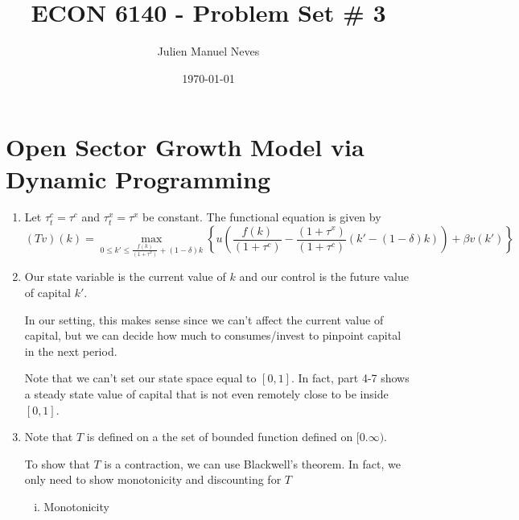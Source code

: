 \documentclass[12pt]{article}
\title{ECON 6140 - Problem Set \# 3}
\date{\today}
\author{Julien Manuel Neves}
\newcommand{\1}{{\bf 1}} %
\begin{document}
\maketitle

\section*{Open Sector Growth Model via Dynamic Programming}

\begin{enumerate}[(1)]
	\item 
	Let $\tau_t^c=\tau^c$ and $\tau_t^x=\tau^x$ be constant. The functional equation is given by	
	\[
	(Tv)(k)=\max_{0\leq k' \leq \frac{f(k)}{(1+\tau^x)}+ (1-\delta)k} \left\lbrace u\left( \frac{f(k)}{(1+\tau^c)}- \frac{(1+\tau^x)}{(1+\tau^c)}(k'-(1-\delta)k) \right)  +\beta v(k')\right\rbrace 
	\]
	\item 
	Our state variable is the current value of $k$ and our control is the future value of capital $k'$. 
	
	In our setting, this makes sense since we can't affect the current value of capital, but we can decide how much to consumes/invest to pinpoint capital in the next period.
	
	Note that we can't set our state space equal to $[0,1]$. In fact, part 4-7 shows a steady state value of capital that is not even remotely close to be inside $[0,1]$.
	
	\item 
	
	Note that $T$ is defined on a the set of bounded function defined on $[0.\infty)$.
	
	To show that $T$ is a contraction, we can use Blackwell's theorem. In fact, we only need to show monotonicity and discounting for $T$
	\begin{enumerate}[(i)]
		\item Monotonicity
		

\end{enumerate}
\end{enumerate}
\end{document}
